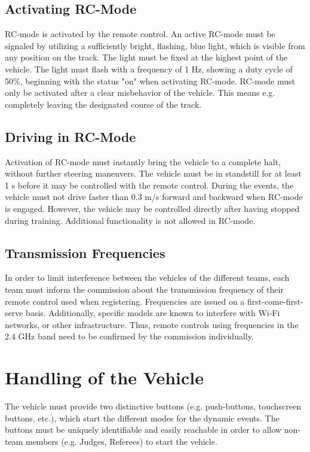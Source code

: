 \subsection{Activating RC-Mode}

RC-mode is activated by the remote control. An active RC-mode must be signaled
by utilizing a sufficiently bright, flashing, blue light, which is visible from
any position on the track. The light must be fixed at the highest point of the
vehicle. The light must flash with a frequency of 1 Hz, showing a duty cycle of
50\%, beginning with the status "on" when activating RC-mode. RC-mode must only
be activated after a clear misbehavior of the vehicle. This means e.g.
completely leaving the designated course of the track.

\subsection{Driving in RC-Mode}

Activation of RC-mode must instantly bring the vehicle to a complete halt,
without further steering maneuvers. The vehicle must be in standstill for at
least 1 s before it may be controlled with the remote control. During the
events, the vehicle must not drive faster than 0.3 m/s forward and backward
when RC-mode is engaged. However, the vehicle may be controlled directly after
having stopped during training. Additional functionality is not allowed in
RC-mode.

\subsection{Transmission Frequencies}

In order to limit interference between the vehicles of the different teams,
each team must inform the commission about the transmission frequency of their
remote control used when registering. Frequencies are issued on a
first-come-first-serve basis. Additionally, specific models are known to
interfere with Wi-Fi networks, or other infrastructure. Thus, remote controls
using frequencies in the 2.4 GHz band need to be confirmed by the commission
individually.

\section{Handling of the Vehicle}

The vehicle must provide two distinctive buttons (e.g. push-buttons,
touchscreen buttons, etc.), which start the different modes for the dynamic
events. The buttons must be uniquely identifiable and easily reachable in order
to allow non-team members (e.g. Judges, Referees) to start the vehicle.

